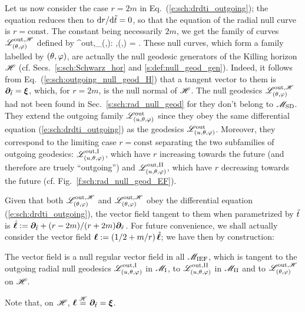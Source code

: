 Let us now consider the case $r=2m$ in
Eq.~(\ref{e:sch:drdti_outgoing}); the equation
reduces then to
$\mathrm{d} r / \mathrm{d} {\tilde t} = 0$, so that the equation of the radial null curve is
$r = \mathrm{const}$. The constant being necessarily $2m$, we get
the family of curves $\mathscr{L}^{{\rm out},\mathscr{H}}_{(\theta,\varphi)}$
defined by
\be \label{e:sch:outgoing_null_geod_H}
    \Li^{{\rm out},\Hor}_{(\th,\ph)}:\quad {} ,\quad (\th,\ph) = .
\ee
These null curves, which form a family labelled by $(\theta,\varphi)$, are actually
the null geodesic generators of the Killing horizon $\mathscr{H}$ (cf. Secs.~\ref{s:sch:Schwarz_hor}
and \ref{s:def:null_geod_gen}).
Indeed, it follows from Eq.~(\ref{e:sch:outgoing_null_geod_H}) that a tangent
vector to them is $\bm{\partial}_{{\tilde t}} = \bm{\xi}$, which, for $r=2m$, is the null normal of $\mathscr{H}$.
The null geodesics $\mathscr{L}^{{\rm out},\mathscr{H}}_{(\theta,\varphi)}$ had not been found in
Sec.~\ref{s:sch:rad_null_geod} for they don't belong to $\mathscr{M}_{\rm SD}$.
They extend the outgoing family $\mathscr{L}^{\rm out}_{(u,\theta,\varphi)}$
since they obey the same differential equation (\ref{e:sch:drdti_outgoing})
as the
geodesics $\mathscr{L}^{\rm out}_{(u,\theta,\varphi)}$. Moreover, they correspond
to the limiting case $r = \mathrm{const}$ separating the two subfamilies of outgoing
geodesics: $\mathscr{L}^{\rm out,I}_{(u,\theta,\varphi)}$, which have $r$ increasing
towards the future (and therefore are truely ``outgoing'') and $\mathscr{L}^{\rm out,II}_{(u,\theta,\varphi)}$,
which have $r$ decreasing towards the future (cf. Fig.~\ref{f:sch:rad_null_geod_EF}).

Given that both $\mathscr{L}^{{\rm out},\mathscr{H}}_{(\theta,\varphi)}$ and $\mathscr{L}^{{\rm out},\mathscr{H}}_{(\theta,\varphi)}$
obey the differential equation (\ref{e:sch:drdti_outgoing}), the vector field
tangent to them when parametrized by ${\tilde t}$ is
$\hat{\bm{\ell}} := \bm{\partial}_{{\tilde t}} +  (r - 2m)/(r + 2m) \bm{\partial}_{\tilde r}$.
For future convenience, we shall actually consider the vector field
$\bm{\ell} := (1/2 + m/r) \, \hat{\bm{\ell}}$; we have then by construction:
\begin{prop}
The vector field
\be \label{e:sch:null_vector_ell}
\ee
is a null regular vector field in all $\mathscr{M}_{\rm IEF}$, which is tangent to the outgoing radial
null geodesics $\mathscr{L}^{\rm out,I}_{(u,\theta,\varphi)}$ in $\mathscr{M}_{\rm I}$,
to $\mathscr{L}^{\rm out,II}_{(u,\theta,\varphi)}$ in $\mathscr{M}_{\rm II}$
and to $\mathscr{L}^{{\rm out},\mathscr{H}}_{(\theta,\varphi)}$ on $\mathscr{H}$.
\end{prop}
Note that, on $\mathscr{H}$, $\bm{\ell} \stackrel{\mathscr{H}}{=} \bm{\partial}_{{\tilde t}} = \bm{\xi}$.

